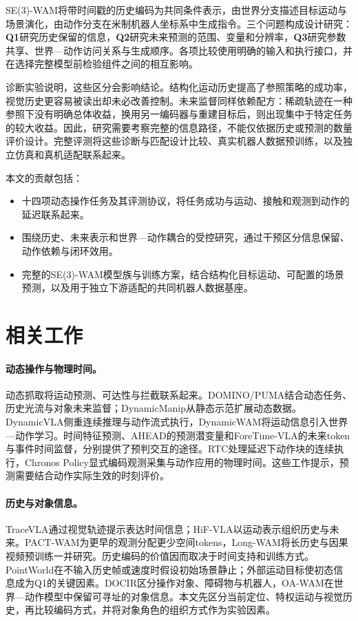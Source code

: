 SE(3)-WAM将带时间戳的历史编码为共同条件表示，由世界分支描述目标运动与场景演化，由动作分支在米制机器人坐标系中生成指令。三个问题构成设计研究：\textbf{Q1}研究历史保留的信息，\textbf{Q2}研究未来预测的范围、变量和分辨率，\textbf{Q3}研究参数共享、世界—动作访问关系与生成顺序。各项比较使用明确的输入和执行接口，并在选择完整模型前检验组件之间的相互影响。

诊断实验说明，这些区分会影响结论。结构化运动历史提高了参照策略的成功率，视觉历史更容易被读出却未必改善控制。未来监督同样依赖配方：稀疏轨迹在一种参照下没有明确总体收益，换用另一编码器与重建目标后，则出现集中于特定任务的较大收益。因此，研究需要考察完整的信息路径，不能仅依据历史或预测的数量评价设计。完整评测将这些诊断与匹配设计比较、真实机器人数据预训练，以及独立仿真和真机适配联系起来。

本文的贡献包括：

\begin{itemize}
\item 十四项动态操作任务及其评测协议，将任务成功与运动、接触和观测到动作的延迟联系起来。
\item 围绕历史、未来表示和世界—动作耦合的受控研究，通过干预区分信息保留、动作依赖与闭环效用。
\item 完整的SE(3)-WAM模型族与训练方案，结合结构化目标运动、可配置的场景预测，以及用于独立下游适配的共同机器人数据基座。
\end{itemize}

\section{相关工作}

\paragraph{动态操作与物理时间。}
动态抓取将运动预测、可达性与拦截联系起来\cite{akinola2021dynamic}。DOMINO/PUMA结合动态任务、历史光流与对象未来监督\cite{domino}；DynamicManip从静态示范扩展动态数据\cite{dynamicmanip}。DynamicVLA侧重连续推理与动作流式执行\cite{dynamicvla}，DynamicWAM将运动信息引入世界—动作学习\cite{dynamicwam}。时间特征预测\cite{dbctfp}、AHEAD的预测潜变量\cite{ahead}和ForeTime-VLA的未来token与事件时间监督\cite{foretime}，分别提供了预判交互的途径。RTC处理延迟下动作块的连续执行\cite{rtc}，Chronos Policy显式编码观测采集与动作应用的物理时间\cite{chronos}。这些工作提示，预测需要结合动作实际生效的时刻评价。

\paragraph{历史与对象信息。}
TraceVLA通过视觉轨迹提示表达时间信息\cite{tracevla}；HiF-VLA以运动表示组织历史与未来\cite{hifvla}。PACT-WAM为更早的观测分配更少空间tokens\cite{pactwam}，Long-WAM将长历史与因果视频预训练一并研究\cite{longwam}。历史编码的价值因而取决于时间支持和训练方式。PointWorld在不输入历史帧或速度时假设初始场景静止\cite{pointworld}；外部运动目标使初态信息成为Q1的关键因素。DOCIR区分操作对象、障碍物与机器人\cite{docir}，OA-WAM在世界—动作模型中保留可寻址的对象信息\cite{oawam}。本文先区分当前定位、特权运动与视觉历史，再比较编码方式，并将对象角色的组织方式作为实验因素。

